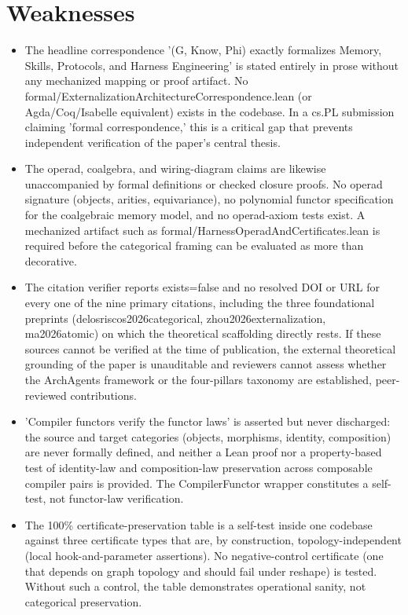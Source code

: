 \documentclass[11pt]{article}
\begin{document}
\section*{Weaknesses}
\begin{itemize}[leftmargin=*]
  \item [GATE — CRITICAL, blocks headline claim] The headline correspondence '(G, Know, Phi) exactly formalizes Memory, Skills, Protocols, and Harness Engineering' is stated entirely in prose without any mechanized mapping or proof artifact. No formal/ExternalizationArchitectureCorrespondence.lean (or Agda/Coq/Isabelle equivalent) exists in the codebase. In a cs.PL submission claiming 'formal correspondence,' this is a critical gap that prevents independent verification of the paper's central thesis.
  \item [GATE — MAJOR] The operad, coalgebra, and wiring-diagram claims are likewise unaccompanied by formal definitions or checked closure proofs. No operad signature (objects, arities, equivariance), no polynomial functor specification for the coalgebraic memory model, and no operad-axiom tests exist. A mechanized artifact such as formal/HarnessOperadAndCertificates.lean is required before the categorical framing can be evaluated as more than decorative.
  \item [CITATION VERIFIER — ALL 9 UNVERIFIABLE] The citation verifier reports exists=false and no resolved DOI or URL for every one of the nine primary citations, including the three foundational preprints (delosriscos2026categorical, zhou2026externalization, ma2026atomic) on which the theoretical scaffolding directly rests. If these sources cannot be verified at the time of publication, the external theoretical grounding of the paper is unauditable and reviewers cannot assess whether the ArchAgents framework or the four-pillars taxonomy are established, peer-reviewed contributions.
  \item [TECHNICAL CORRECTNESS — MAJOR, C8] 'Compiler functors verify the functor laws' is asserted but never discharged: the source and target categories (objects, morphisms, identity, composition) are never formally defined, and neither a Lean proof nor a property-based test of identity-law and composition-law preservation across composable compiler pairs is provided. The CompilerFunctor wrapper constitutes a self-test, not functor-law verification.
  \item [TECHNICAL CORRECTNESS — MAJOR, C3] The 100\% certificate-preservation table is a self-test inside one codebase against three certificate types that are, by construction, topology-independent (local hook-and-parameter assertions). No negative-control certificate (one that depends on graph topology and should fail under reshape) is tested. Without such a control, the table demonstrates operational sanity, not categorical preservation.

\end{itemize}
\end{document}
